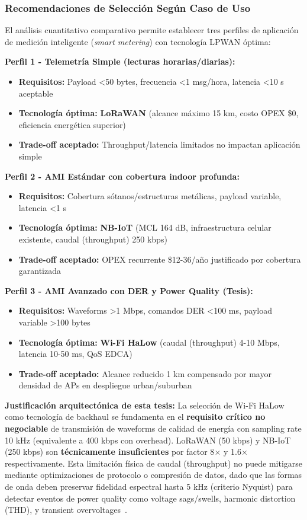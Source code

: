 \subsubsection{Recomendaciones de Selección Según Caso de Uso}

El análisis cuantitativo comparativo permite establecer tres perfiles de aplicación de medición inteligente (\textit{smart metering}) con tecnología LPWAN óptima:

\textbf{Perfil 1 - Telemetría Simple (lecturas horarias/diarias):}
\begin{itemize}
\item \textbf{Requisitos:} Payload <50 bytes, frecuencia <1 msg/hora, latencia <10 s aceptable
\item \textbf{Tecnología óptima:} \textbf{LoRaWAN} (alcance máximo 15 km, costo OPEX \$0, eficiencia energética superior)
\item \textbf{Trade-off aceptado:} Throughput/latencia limitados no impactan aplicación simple
\end{itemize}

\textbf{Perfil 2 - AMI Estándar con cobertura indoor profunda:}
\begin{itemize}
\item \textbf{Requisitos:} Cobertura sótanos/estructuras metálicas, payload variable, latencia <1 s
\item \textbf{Tecnología óptima:} \textbf{NB-IoT} (MCL 164 dB, infraestructura celular existente, caudal (throughput) 250 kbps)
\item \textbf{Trade-off aceptado:} OPEX recurrente \$12-36/año justificado por cobertura garantizada
\end{itemize}

\textbf{Perfil 3 - AMI Avanzado con DER y Power Quality (Tesis):}
\begin{itemize}
\item \textbf{Requisitos:} Waveforms >1 Mbps, comandos DER <100 ms, payload variable >100 bytes
\item \textbf{Tecnología óptima:} \textbf{Wi-Fi HaLow} (caudal (throughput) 4-10 Mbps, latencia 10-50 ms, QoS EDCA)
\item \textbf{Trade-off aceptado:} Alcance reducido 1 km compensado por mayor densidad de APs en despliegue urban/suburban
\end{itemize}

\textbf{Justificación arquitectónica de esta tesis:} La selección de Wi-Fi HaLow como tecnología de backhaul se fundamenta en el \textbf{requisito crítico no negociable} de transmisión de waveforms de calidad de energía con sampling rate 10 kHz (equivalente a 400 kbps con overhead). LoRaWAN (50 kbps) y NB-IoT (250 kbps) son \textbf{técnicamente insuficientes} por factor 8$\times$ y 1.6$\times$ respectivamente. Esta limitación física de caudal (throughput) no puede mitigarse mediante optimizaciones de protocolo o compresión de datos, dado que las formas de onda deben preservar fidelidad espectral hasta 5 kHz (criterio Nyquist) para detectar eventos de power quality como voltage sags/swells, harmonic distortion (THD), y transient overvoltages~\cite{chaudhariLPWANTechnologiesEmerging2020,zhengPerformancePowerConsumption2018}.

